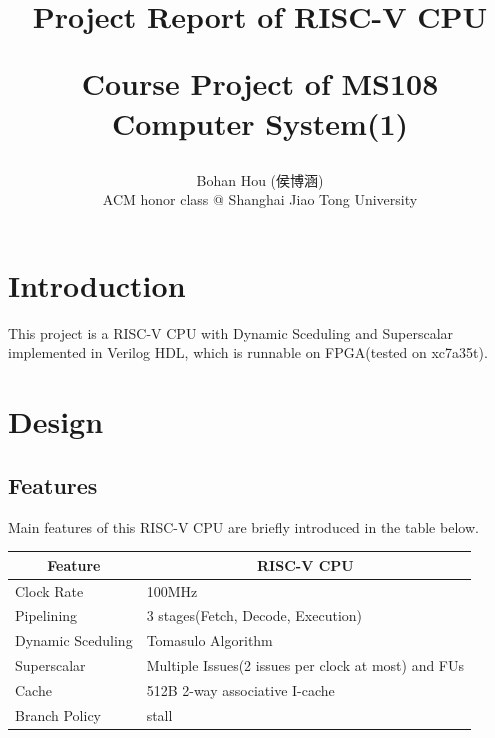 \documentclass[12pt, a4paper]{article}
\title{Project Report of RISC-V CPU\\\begin{large}Course Project of MS108 Computer System(1)\end{large}}
\author{Bohan Hou (侯博涵)\\ACM honor class @ Shanghai Jiao Tong University}
\date{}
\theoremstyle{margin}
\begin{document}
\maketitle

\section{Introduction}
This project is a RISC-V CPU with Dynamic Sceduling and Superscalar implemented in Verilog HDL, which is runnable on FPGA(tested on xc7a35t).
\section{Design}

\subsection{Features}

Main features of this RISC-V CPU are briefly introduced in the table below.

\begin{table}[H]
\centering
\begin{tabular}{@{}ll@{}}
\toprule
\multicolumn{1}{c}{Feature} & \multicolumn{1}{c}{RISC-V CPU}                                                                        \\ \midrule
Clock Rate                  & 100MHz \\
Pipelining                  & 3 stages(Fetch, Decode, Execution) \\
Dynamic Sceduling           & Tomasulo Algorithm \\
Superscalar                 & Multiple Issues(2 issues per clock at most) and FUs \\
Cache                       & 512B 2-way associative I-cache\\
Branch Policy               & stall \\
\bottomrule
\end{tabular}
\end{table}
\end{document}
